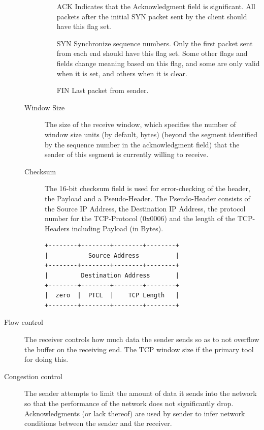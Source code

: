 \documentclass{article}
\begin{document}
\begin{description}
\begin{description}
        \begin{itemize}
            \item[ACK] Indicates that the Acknowledgment field is significant. All packets after the
            initial SYN packet sent by the client should have this flag set.
            \item[SYN] Synchronize sequence numbers. Only the first packet sent from each end should
            have this flag set. Some other flags and fields change meaning based on this flag, and some
            are only valid when it is set, and others when it is clear.
            \item[FIN] Last packet from sender.
        \end{itemize}
        \item[Window Size] The size of the receive window, which specifies the number of window size
        units (by default, bytes) (beyond the segment identified by the sequence number in the
        acknowledgment field) that the sender of this segment is currently willing to receive.
        \item[Checksum] The 16-bit checksum field is used for error-checking of the header, the Payload
        and a Pseudo-Header. The Pseudo-Header consists of the Source IP Address, the Destination IP
        Address, the protocol number for the TCP-Protocol (0x0006) and the length of the TCP-Headers
        including Payload (in Bytes).
        \begin{lstlisting}
+--------+--------+--------+--------+
|           Source Address          |
+--------+--------+--------+--------+
|         Destination Address       |
+--------+--------+--------+--------+
|  zero  |  PTCL  |    TCP Length   |
+--------+--------+--------+--------+
        \end{lstlisting}
    \end{description}
    
    \item[Flow control] The receiver controls how much data the sender sends so as to not overflow the 
    buffer on the receiving end. The TCP window size if the primary tool for doing this.
    
    \item[Congestion control] The sender attempts to limit the amount of data it sends into the network
    so that the performance of the network does not significantly drop. Acknowledgments (or lack thereof)
    are used by sender to infer network conditions between the sender and the receiver.
\end{description}
\end{document}
